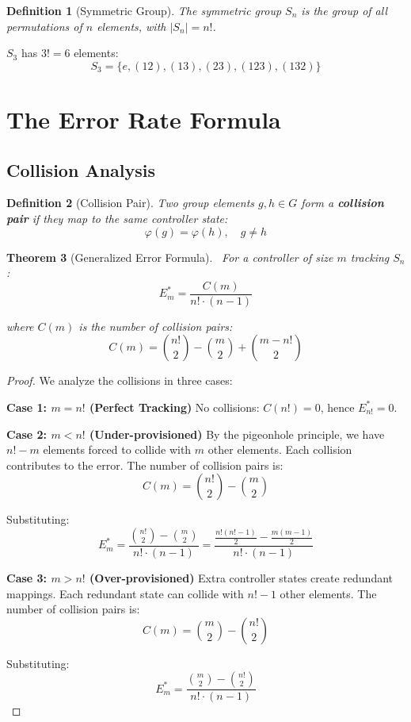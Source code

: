 \documentclass[11pt]{article}
\newtheorem{theorem}{Theorem}[section]
\newtheorem{definition}[theorem]{Definition}
\begin{document}
\begin{definition}[Symmetric Group]
The symmetric group $S_n$ is the group of all permutations of $n$ elements, with $|S_n| = n!$.
\end{definition}

\begin{example}
$S_3$ has $3! = 6$ elements:
$$S_3 = \{e, (12), (13), (23), (123), (132)\}$$
\end{example}

\section{The Error Rate Formula}

\subsection{Collision Analysis}

\begin{definition}[Collision Pair]
Two group elements $g, h \in G$ form a \textbf{collision pair} if they map to the same controller state:
$$\varphi(g) = \varphi(h), \quad g \neq h$$
\end{definition}

\begin{theorem}[Generalized Error Formula]~\label{thm:error}
For a controller of size $m$ tracking $S_n$:
$$E_m^* = \frac{C(m)}{n! \cdot (n-1)}$$

where $C(m)$ is the number of collision pairs:
$$C(m) = \binom{n!}{2} - \binom{m}{2} + \binom{m - n!}{2}$$
\end{theorem}

\begin{proof}
We analyze the collisions in three cases:

\textbf{Case 1: $m = n!$ (Perfect Tracking)}
No collisions: $C(n!) = 0$, hence $E_{n!}^* = 0$.

\textbf{Case 2: $m < n!$ (Under-provisioned)}
By the pigeonhole principle, we have $n! - m$ elements forced to collide with $m$ other elements. Each collision contributes to the error. The number of collision pairs is:
$$C(m) = \binom{n!}{2} - \binom{m}{2}$$

Substituting:
$$E_m^* = \frac{\binom{n!}{2} - \binom{m}{2}}{n! \cdot (n-1)} = \frac{\frac{n!(n!-1)}{2} - \frac{m(m-1)}{2}}{n! \cdot (n-1)}$$

\textbf{Case 3: $m > n!$ (Over-provisioned)}
Extra controller states create redundant mappings. Each redundant state can collide with $n! - 1$ other elements. The number of collision pairs is:
$$C(m) = \binom{m}{2} - \binom{n!}{2}$$

Substituting:
$$E_m^* = \frac{\binom{m}{2} - \binom{n!}{2}}{n! \cdot (n-1)}$$
\end{proof}
\end{document}

